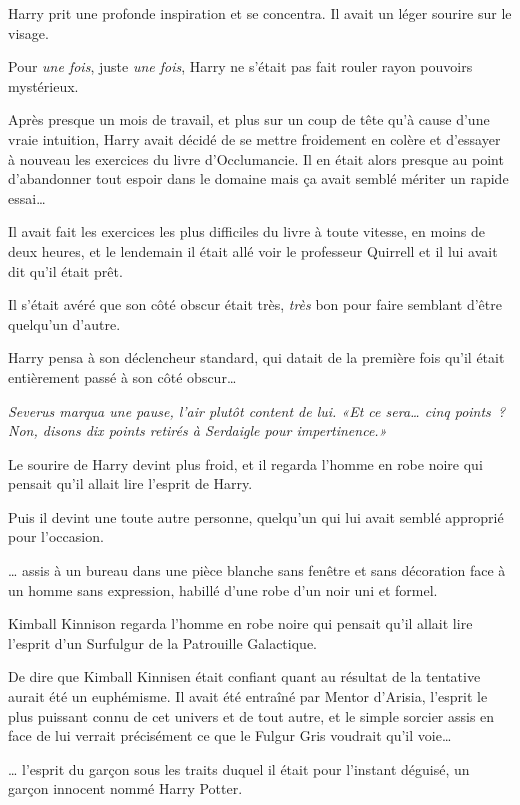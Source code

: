 Harry prit une profonde inspiration et se concentra. Il avait un léger sourire sur le visage.

Pour \emph{une fois}, juste \emph{une fois}, Harry ne s'était pas fait rouler rayon pouvoirs mystérieux.

Après presque un mois de travail, et plus sur un coup de tête qu'à cause d'une vraie intuition, Harry avait décidé de se mettre froidement en colère et d'essayer à nouveau les exercices du livre d'Occlumancie. Il en était alors presque au point d'abandonner tout espoir dans le domaine mais ça avait semblé mériter un rapide essai…

Il avait fait les exercices les plus difficiles du livre à toute vitesse, en moins de deux heures, et le lendemain il était allé voir le professeur Quirrell et il lui avait dit qu'il était prêt.

Il s'était avéré que son côté obscur était très, \emph{très} bon pour faire semblant d'être quelqu'un d'autre.

Harry pensa à son déclencheur standard, qui datait de la première fois qu'il était entièrement passé à son côté obscur…

\emph{Severus marqua une pause, l'air plutôt content de lui. «Et ce sera… cinq points~? Non, disons dix points retirés à Serdaigle pour impertinence.»}

Le sourire de Harry devint plus froid, et il regarda l'homme en robe noire qui pensait qu'il allait lire l'esprit de Harry.

Puis il devint une toute autre personne, quelqu'un qui lui avait semblé approprié pour l'occasion.

\later

… assis à un bureau dans une pièce blanche sans fenêtre et sans décoration face à un homme sans expression, habillé d’une robe d'un noir uni et formel.

Kimball Kinnison regarda l'homme en robe noire qui pensait qu'il allait lire l'esprit d'un Surfulgur de la Patrouille Galactique.

De dire que Kimball Kinnisen était confiant quant au résultat de la tentative aurait été un euphémisme. Il avait été entraîné par Mentor d'Arisia, l'esprit le plus puissant connu de cet univers et de tout autre, et le simple sorcier assis en face de lui verrait précisément ce que le Fulgur Gris voudrait qu'il voie…

… l'esprit du garçon sous les traits duquel il était pour l'instant déguisé, un garçon innocent nommé Harry Potter.


